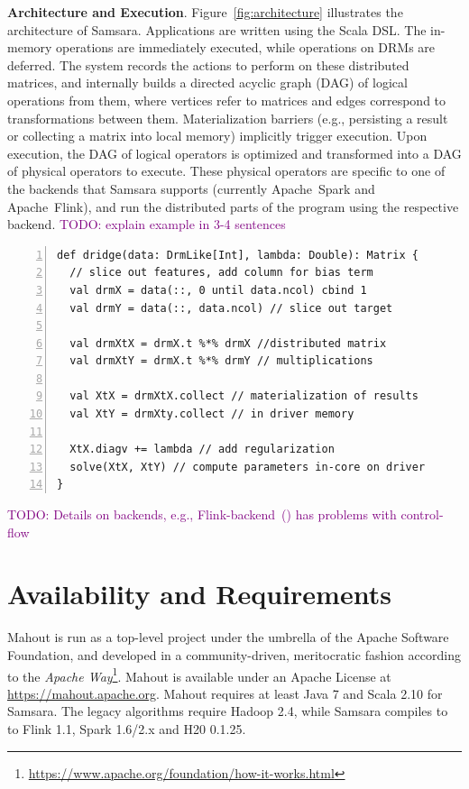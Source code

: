 \documentclass[twoside,11pt]{article}
\newcommand{\todo}[1]{\textcolor{purple}{TODO: #1}}
\begin{document}
%
\noindent\textbf{Architecture and Execution}. Figure~\ref{fig:architecture} illustrates the architecture of Samsara. Applications are written using the Scala DSL. The in-memory operations are immediately executed, while operations on DRMs are deferred. The system records the actions to perform on these distributed matrices, and internally builds a directed acyclic graph (DAG) of logical operations from them, where vertices refer to matrices and edges correspond to transformations between them. Materialization barriers (e.g., persisting a result or collecting a matrix into local memory) implicitly trigger execution. Upon execution, the DAG of logical operators is optimized and transformed into a DAG of physical operators to execute. These physical operators are specific to one of the backends that Samsara supports (currently Apache~Spark and Apache~Flink), and run the distributed parts of the program using the respective backend. \todo{explain example in 3-4 sentences}

\begin{lstlisting}[numbers=left,numberstyle={\tiny},caption={Distributed Ridge Regression for tall \& skinny matrices using Samsara.},captionpos=b,label={lst:linearRegr}]
def dridge(data: DrmLike[Int], lambda: Double): Matrix {
  // slice out features, add column for bias term
  val drmX = data(::, 0 until data.ncol) cbind 1
  val drmY = data(::, data.ncol) // slice out target

  val drmXtX = drmX.t %*% drmX //distributed matrix
  val drmXtY = drmX.t %*% drmY // multiplications

  val XtX = drmXtX.collect // materialization of results
  val XtY = drmXty.collect // in driver memory

  XtX.diagv += lambda // add regularization
  solve(XtX, XtY) // compute parameters in-core on driver
}
\end{lstlisting}

\todo{Details on backends, e.g., Flink-backend~(\cite{Alexandrov2014}) has problems with control-flow}

\section{Availability and Requirements}

Mahout is run as a top-level project under the umbrella of the Apache Software Foundation, and developed in a community-driven, meritocratic fashion according to the \textit{Apache Way}\footnote{\url{https://www.apache.org/foundation/how-it-works.html}}. Mahout is available under an Apache License at \url{https://mahout.apache.org}. Mahout requires at least Java 7 and Scala 2.10 for Samsara. The legacy algorithms require Hadoop 2.4, while Samsara compiles to to Flink 1.1, Spark 1.6/2.x and H20 0.1.25.
\end{document}
